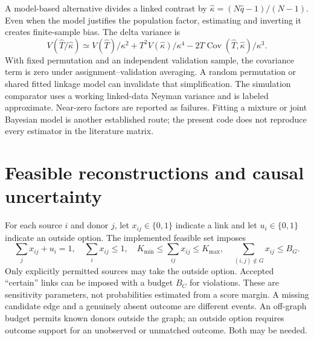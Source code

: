 \documentclass[11pt]{article}
\newcommand{\Cov}{\operatorname{Cov}}
\begin{document}
A model-based alternative divides a linked contrast by
$\widehat\kappa=(N\widehat q-1)/(N-1)$. Even when the model justifies the population
factor, estimating and inverting it creates finite-sample bias. The delta variance is
\[
 V(\widehat T/\widehat\kappa)\simeq V(\widehat T)/\kappa^2+
 T^2V(\widehat\kappa)/\kappa^4-2T\Cov(\widehat T,\widehat\kappa)/\kappa^3.
\]
With fixed permutation and an independent validation sample, the covariance term is
zero under assignment--validation averaging. A random permutation or shared fitted
linkage model can invalidate that simplification. The simulation comparator uses a
working linked-data Neyman variance and is labeled approximate. Near-zero factors are
reported as failures. Fitting a mixture or joint Bayesian model is another established
route; the present code does not reproduce every estimator in the literature matrix.

\section{Feasible reconstructions and causal uncertainty}
For each source $i$ and donor $j$, let $x_{ij}\in\{0,1\}$ indicate a link and let
$u_i\in\{0,1\}$ indicate an outside option. The implemented feasible set imposes
\[
 \sum_jx_{ij}+u_i=1,\quad \sum_ix_{ij}\le1,\quad
 K_{\min}\le\sum_{ij}x_{ij}\le K_{\max},\quad
 \sum_{(i,j)\notin G}x_{ij}\le B_G.
\]
Only explicitly permitted sources may take the outside option. Accepted ``certain''
links can be imposed with a budget $B_C$ for violations. These are sensitivity
parameters, not probabilities estimated from a score margin. A missing candidate edge
and a genuinely absent outcome are different events. An off-graph budget permits
known donors outside the graph; an outside option requires outcome support for an
unobserved or unmatched outcome. Both may be needed.
\end{document}
